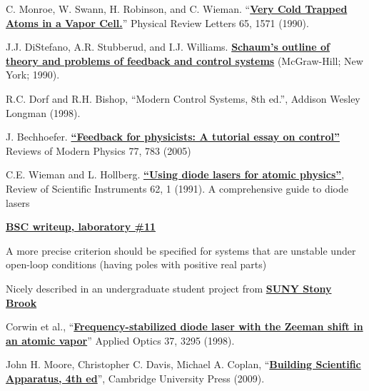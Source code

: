 \documentclass{../lab}
\begin{document}
\begin{thebibliography}{}
     C. Monroe, W. Swann, H. Robinson, and C. Wieman. ``\href{http://physics111.lib.berkeley.edu/Physics111/Reprints/MOT/Very\%20Cold\%20Trapped\%20Atoms\%20in\%20a\%20Vapor\%20Cell_PhysRevLett.65.1571.pdf}{\textbf{Very Cold Trapped Atoms in a Vapor Cell.}}'' Physical Review Letters 65, 1571 (1990).

     J.J. DiStefano, A.R. Stubberud, and I.J. Williams. \href{http://physics111.lib.berkeley.edu/Physics111/Reprints/MOT/Schaum's\%20Outline\%20Theory\%20and\%20Problems\%20of\%20Feedback\%20and\%20Control\%20Systems/}{\textbf{Schaum’s outline of theory and problems of feedback and control systems}} (McGraw-Hill; New York; 1990).

     R.C. Dorf and R.H. Bishop, ``Modern Control Systems, 8th ed.'', Addison Wesley Longman (1998).

     J. Bechhoefer. \href{http://physics111.lib.berkeley.edu/Physics111/Reprints/MOT/Bechhoefer_RMP_v77-2005-p783_1.pdf}{\textbf{``Feedback for physicists: A tutorial essay on control''}} Reviews of Modern Physics 77, 783 (2005)

     C.E. Wieman and L. Hollberg. \href{http://physics111.lib.berkeley.edu/Physics111/Reprints/MOT/usingdiodelasersforatomicphysics.pdf}{\textbf{``Using diode lasers for atomic physics''}}, Review of Scientific Instruments 62, 1 (1991). A comprehensive guide to diode lasers

     \href{http://socrates.berkeley.edu/~phylabs/bsc/PDFFiles/bscLV-11.pdf}{\textbf{BSC writeup, laboratory \#11}}

     A more precise criterion should be specified for systems that are unstable under open-loop conditions (having poles with positive real parts)

     Nicely described in an undergraduate student project from \href{http://laser.physics.sunysb.edu/~simone/mini-project/}{\textbf{SUNY Stony Brook}}

     Corwin et al., ``\href{http://physics111.lib.berkeley.edu/Physics111/Reprints/MOT/Frequency-stabilized\%20diode\%20laser\%20with\%20the\%20Zeeman\%20shift\%20in\%20an\%20atomic\%20vapor\%20ao-37-15-3295.pdf}{\textbf{Frequency-stabilized diode laser with the Zeeman shift in an atomic vapor}}'' Applied Optics 37, 3295 (1998).

     John H. Moore, Christopher C. Davis, Michael A. Coplan, ``\href{http://physics111.lib.berkeley.edu/Physics111/Reprints/MOT/John\%20Moore,\%20Christopher\%20Davis,\%20Michael\%20A.\%20Coplan_Building\%20Scientific\%20Apparatus,\%204th\%20ed.pdf}{\textbf{Building Scientific Apparatus, 4th ed}}'', Cambridge University Press (2009).
\end{thebibliography}
\end{document}
